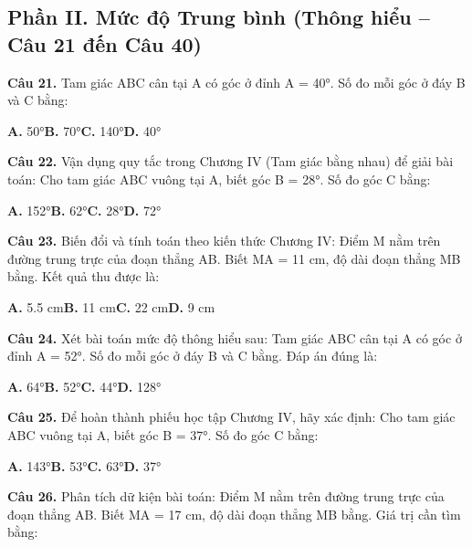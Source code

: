 \documentclass[11pt,a4paper]{article}
\begin{document}
\subsection*{\color{accent} Phần II. Mức độ Trung bình (Thông hiểu -- Câu 21 đến Câu 40)}
\textbf{\color{primary} Câu 21.} Tam giác ABC cân tại A có góc ở đỉnh A = 40°. Số đo mỗi góc ở đáy B và C bằng:\par
\hspace*{1.5em}\textbf{A.} 50°\quad\quad \textbf{B.} 70°\quad\quad \textbf{C.} 140°\quad\quad \textbf{D.} 40°\par\vspace{2pt}
\textbf{\color{primary} Câu 22.} Vận dụng quy tắc trong Chương IV (Tam giác bằng nhau) để giải bài toán: Cho tam giác ABC vuông tại A, biết góc B = 28°. Số đo góc C bằng:\par
\hspace*{1.5em}\textbf{A.} 152°\quad\quad \textbf{B.} 62°\quad\quad \textbf{C.} 28°\quad\quad \textbf{D.} 72°\par\vspace{2pt}
\textbf{\color{primary} Câu 23.} Biến đổi và tính toán theo kiến thức Chương IV: Điểm M nằm trên đường trung trực của đoạn thẳng AB. Biết MA = 11 cm, độ dài đoạn thẳng MB bằng. Kết quả thu được là:\par
\hspace*{1.5em}\textbf{A.} 5.5 cm\quad\quad \textbf{B.} 11 cm\quad\quad \textbf{C.} 22 cm\quad\quad \textbf{D.} 9 cm\par\vspace{2pt}
\textbf{\color{primary} Câu 24.} Xét bài toán mức độ thông hiểu sau: Tam giác ABC cân tại A có góc ở đỉnh A = 52°. Số đo mỗi góc ở đáy B và C bằng. Đáp án đúng là:\par
\hspace*{1.5em}\textbf{A.} 64°\quad\quad \textbf{B.} 52°\quad\quad \textbf{C.} 44°\quad\quad \textbf{D.} 128°\par\vspace{2pt}
\textbf{\color{primary} Câu 25.} Để hoàn thành phiếu học tập Chương IV, hãy xác định: Cho tam giác ABC vuông tại A, biết góc B = 37°. Số đo góc C bằng:\par
\hspace*{1.5em}\textbf{A.} 143°\quad\quad \textbf{B.} 53°\quad\quad \textbf{C.} 63°\quad\quad \textbf{D.} 37°\par\vspace{2pt}
\textbf{\color{primary} Câu 26.} Phân tích dữ kiện bài toán: Điểm M nằm trên đường trung trực của đoạn thẳng AB. Biết MA = 17 cm, độ dài đoạn thẳng MB bằng. Giá trị cần tìm bằng:\par
\end{document}
